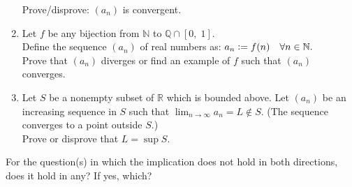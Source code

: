 \documentclass{article}
\begin{document}
\begin{enumerate}
	Prove/disprove: $(a_n)$ is convergent.
	\item Let $f$ be any bijection from $\mathbb{N}$ to $\mathbb{Q} \cap [0,\; 1].$\\
	Define the sequence $(a_n)$ of real numbers as: $a_n \vcentcolon= f(n) \quad \forall n \in \mathbb{N}.$\\
	Prove that $(a_n)$ diverges or find an example of $f$ such that $(a_n)$ converges.
	\item Let $S$ be a nonempty subset of $\mathbb{R}$ which is bounded above. Let $(a_n)$ be an increasing sequence in $S$ such that $\displaystyle\lim_{n\to \infty}a_n = L \not\in S.$ (The sequence converges to a point outside $S.$)\\
	 Prove or disprove that $L = \sup S.$ 
\end{enumerate}
For the question(s) in which the implication does not hold in both directions, does it hold in any? If yes, which?
\end{document}
